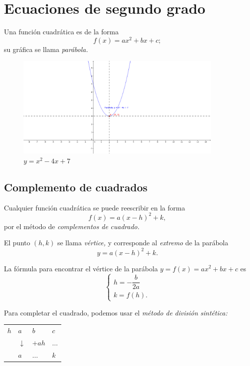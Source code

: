 \section{Ecuaciones de segundo grado}


	Una funci\'on cuadrática es de la forma $$f(x)=ax^{2}+bx+c;$$ su gráfica se llama \emph{parábola.}



	\begin{figure}
		\centering
		\includegraphics[height=5cm,keepaspectratio=true]{./precalculo/IM020401.png}
		\caption{$y=x^2-4x+7$}
		\label{fig:020401}
	\end{figure}
	


\subsection{Complemento de cuadrados}


	Cualquier funci\'on cuadrática se puede reescribir en la forma
	$$
	f(x)=a(x-h)^2+k,
	$$
	por el m\'etodo de \emph{complementos de cuadrado.}



	El punto $(h,k)$ se llama \emph{v\'ertice,} y corresponde al \emph{extremo} de la parábola
	$$
	y=a(x-h)^2+k.
	$$



	La f\'ormula para encontrar el v\'ertice de la parábola 
	$y=f(x)=ax^2+bx+c$ es
	$$\begin{cases}
		h=-\dfrac{b}{2a}\\
		k=f(h).
	\end{cases}
	$$ 



	Para completar el cuadrado, podemos usar el \emph{m\'etodo de divisi\'on sint\'etica:}
	\begin{center}
		\begin{tabular}{l|lll}
			$h$ & $a$ & $b$ & $c$\\
			& $\downarrow$ & $+ah$ & $\dots$\\\hline
			& $a$ & $\dots$ & $k$
		\end{tabular}
	\end{center}




